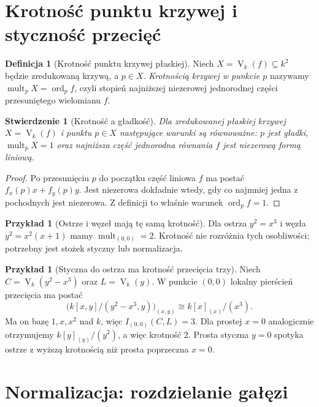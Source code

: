 \documentclass[11pt,a4paper,openany]{report}
\numberwithin{equation}{section}
\theoremstyle{plain}
\newtheorem{stwierdzenie}[twierdzenie]{Stwierdzenie}
\theoremstyle{definition}
\newtheorem{definicja}[twierdzenie]{Definicja}
\newtheorem{przyklad}[twierdzenie]{Przykład}
\theoremstyle{remark}
\newcommand{\V}{\operatorname V}
\begin{document}
\section{Krotność punktu krzywej i styczność przecięć}

\begin{definicja}[Krotność punktu krzywej płaskiej]
Niech $X=\V_k(f)\subseteq k^2$ będzie zredukowaną krzywą,
a $p\in X$. \emph{Krotnością krzywej w punkcie $p$}
nazywamy $\operatorname{mult}_pX=\operatorname{ord}_pf$,
czyli stopień najniższej niezerowej jednorodnej części
przesuniętego wielomianu $f$.
\end{definicja}

\begin{stwierdzenie}[Krotność a gładkość]
Dla zredukowanej płaskiej krzywej $X=\V_k(f)$
i punktu $p\in X$ następujące warunki są równoważne:
$p$ jest gładki, $\operatorname{mult}_pX=1$ oraz
najniższa część jednorodna równania $f$ jest niezerową
formą liniową.
\end{stwierdzenie}
\begin{proof}
Po przesunięciu $p$ do początku część liniowa $f$
ma postać $f_x(p)x+f_y(p)y$. Jest niezerowa dokładnie wtedy,
gdy co najmniej jedna z pochodnych jest niezerowa.
Z definicji to właśnie warunek $\operatorname{ord}_pf=1$.
\end{proof}

\begin{przyklad}[Ostrze i węzeł mają tę samą krotność]
Dla ostrza $y^2=x^3$ i węzła $y^2=x^2(x+1)$
mamy $\operatorname{mult}_{(0,0)}=2$.
Krotność nie rozróżnia tych osobliwości; potrzebny jest
stożek styczny lub normalizacja.
\end{przyklad}

\begin{przyklad}[Styczna do ostrza ma krotność przecięcia trzy]
Niech $C=\V_k(y^2-x^3)$ oraz $L=\V_k(y)$.
W punkcie $(0,0)$ lokalny pierścień przecięcia ma postać
\[
 \bigl(k[x,y]/(y^2-x^3,y)\bigr)_{(x,y)}
 \cong k[x]_{(x)}/(x^3).
\]
Ma on bazę $1,x,x^2$ nad $k$, więc
$I_{(0,0)}(C,L)=3$. Dla prostej $x=0$ analogicznie
otrzymujemy $k[y]_{(y)}/(y^2)$, a więc krotność $2$.
Prosta styczna $y=0$ spotyka ostrze z wyższą krotnością
niż prosta poprzeczna $x=0$.
\end{przyklad}

\section{Normalizacja: rozdzielanie gałęzi}
\end{document}
